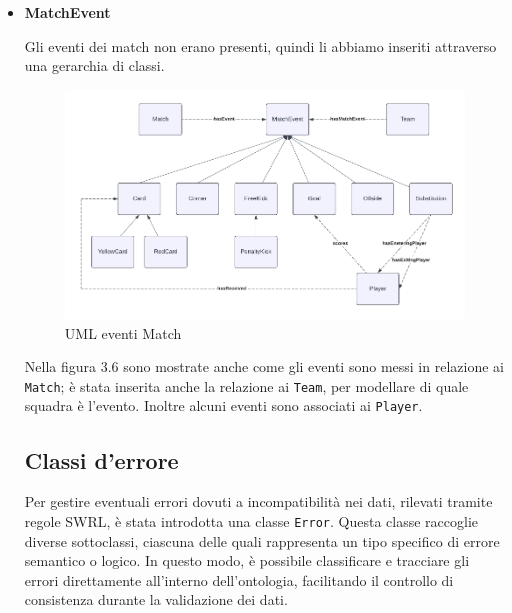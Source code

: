 \documentclass[11pt]{report} %
\begin{document}
\begin{itemize}[leftmargin=*]
  \item \textbf{MatchEvent}
  
  Gli eventi dei match non erano presenti, quindi li abbiamo inseriti attraverso una gerarchia di classi.

\begin{figure} [h]
    \centering
    \includegraphics[width=1.1\linewidth]{MATCHEVENT.png}
    \caption{UML eventi Match}
    \label{fig:enter-label}
\end{figure}

Nella figura 3.6 sono mostrate anche come gli eventi sono messi in relazione ai \texttt{Match}; è stata inserita anche la relazione ai \texttt{Team}, per modellare di quale squadra è l'evento. Inoltre alcuni eventi sono associati ai \texttt{Player}. 

\newpage
 \subsection{Classi d'errore}
Per gestire eventuali errori dovuti a incompatibilità nei dati, rilevati tramite regole SWRL, è stata introdotta una classe \texttt{Error}. Questa classe raccoglie diverse sottoclassi, ciascuna delle quali rappresenta un tipo specifico di errore semantico o logico. In questo modo, è possibile classificare e tracciare gli errori direttamente all’interno dell’ontologia, facilitando il controllo di consistenza durante la validazione dei dati.


\end{itemize}
\end{document}
